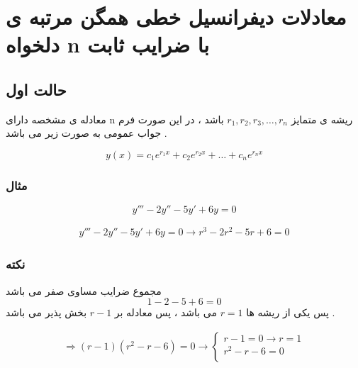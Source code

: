 \documentclass[12pt]{book}
\begin{document}
\section{معادلات دیفرانسیل خطی همگن مرتبه ی دلخواه n با ضرایب ثابت}

\subsection{حالت اول}

معادله ی مشخصه دارای n ریشه ی متمایز 
$r_{1} , r_{2} ,  r_{3} , \dots , r_{n}$
باشد ، در این صورت فرم جواب عمومی به صورت زیر می باشد .

$$
y(x) = c_{1}e^{r_{1}x} + c_{2}e^{r_{2}x} + \dots + c_{n}e^{r_{n}x}
$$


\subsubsection{مثال}

$$
y''' - 2y'' - 5y' + 6y = 0
$$

\begin{align*}
y''' - 2y'' - 5y' + 6y = 0 \to r^{3} - 2r^{2} - 5r + 6 = 0
\end{align*}

\subsubsection{نکته}
مجموع ضرایب مساوی صفر می باشد
$$
1 - 2 - 5 + 6 = 0
$$
پس یکی از ریشه ها 
$r = 1$
می باشد ، پس معادله بر 
$r - 1$
بخش پذیر می باشد .\newline \newline







\begin{align*}
\Rightarrow 
(r-1)(r^{2} - r - 6) = 0 \to 
\begin{cases}
r -1 = 0 \to r = 1 \\
r^{2} - r - 6 = 0 \\
\end{cases}
\end{align*}
\end{document}
